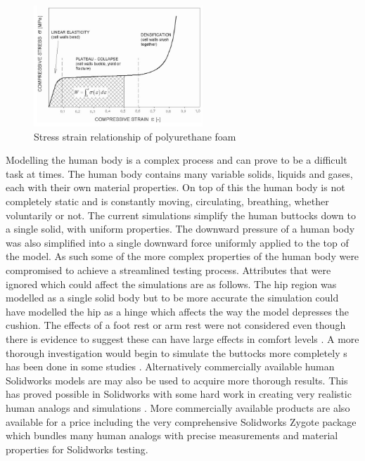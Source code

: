 \documentclass[conference]{IEEEtran}
\begin{document}
  \begin{figure}[!t]
\centering
 \includegraphics[width=2.5in]{pics/compressionFoam.JPG}
    \caption{Stress strain relationship of polyurethane foam}
    \label{foam}
\end{figure}
    
    Modelling the human body is a complex process and can prove to be a difficult task at times. The human body contains many variable solids, liquids and gases, each with their own material properties. On top of this the human body is not completely static and is constantly moving, circulating, breathing, whether voluntarily or not. The current simulations simplify the human buttocks down to a single solid, with uniform properties. The downward pressure of a human body was also simplified into a single downward force uniformly applied to the top of the model. As such some of the more complex properties of the human body were compromised to achieve a streamlined testing process. Attributes that were ignored which could affect the simulations are as follows. The hip region was modelled as a single solid body but to be more accurate the simulation could have modelled the hip as a hinge which affects the way the model depresses the cushion. The effects of a foot rest or arm rest were not considered even though there is evidence to suggest these can have large effects in comfort levels \cite{Khanam2006,drury1982}. A more thorough investigation would begin to simulate the buttocks more completely s has been done in some studies \cite{Shu2009}. Alternatively commercially available human Solidworks models are may also be used to acquire more thorough results. This has proved possible in Solidworks with some hard work in creating very realistic human analogs and simulations \cite{Shu2009,Al-Dirini2012}. More commercially available products are also available for a price including the very comprehensive Solidworks Zygote package \cite{Zygot7:online} which bundles many human analogs with precise measurements and material properties for Solidworks testing.
    
\end{document}
